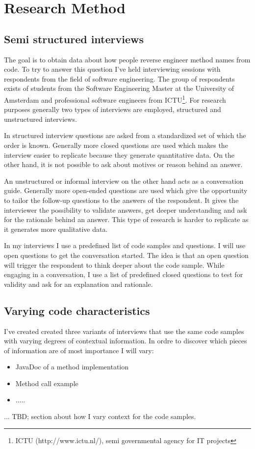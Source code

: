 \section{Research Method}

\subsection{Semi structured interviews}
The goal is to obtain data about how people reverse engineer method names from code. To try to answer this question I've held interviewing sessions with respondents from the field of software engineering. The group of respondents exists of students from the Software Engineering Master at the University of Amsterdam and professional software engineers from ICTU\footnote{ICTU (http://www.ictu.nl/), semi governmental agency for IT projects}. For research purposes generally two types of interviews are employed, structured and unstructured interviews.

In structured interview questions are asked from a standardized set of which the order is known. Generally more closed questions are used which makes the interview easier to replicate because they generate quantitative data. On the other hand, it is not possible to ask about motives or reason behind an answer.

An unstructured or informal interview on the other hand acts as a conversation guide. Generally more open-ended questions are used which give the opportunity to tailor the follow-up questions to the answers of the respondent. It gives the interviewer the possibility to validate answers, get deeper understanding and ask for the rationale behind an answer. This type of research is harder to replicate as it generates more qualitative data.

In my interviews I use a predefined list of code samples and questions. I will use open questions to get the conversation started. The idea is that an open question will trigger the respondent to think deeper about the code sample. While engaging in a conversation, I use a list of predefined closed questions to test for validity and ask for an explanation and rationale.

\subsection{Varying code characteristics}
I've created created three variants of interviews that use the same code samples with varying degrees of contextual information. In ordre to discover which pieces of information are of most importance I will vary:

\begin{itemize}
\item JavaDoc of a method implementation
\item Method call example
\item .....
\end{itemize}

... TBD; section about how I vary context for the code samples.
